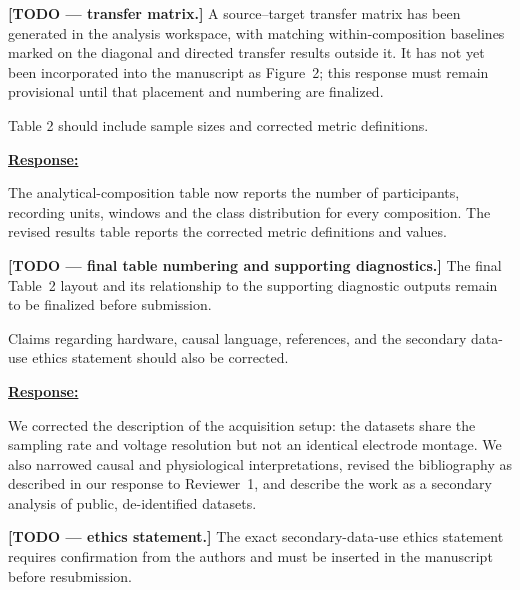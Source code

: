 \documentclass{article}
\begin{document}
\textbf{[TODO --- transfer matrix.]}
A source--target transfer matrix has been generated in the analysis workspace,
with matching within-composition baselines marked on the diagonal and directed
transfer results outside it. It has not yet been incorporated into the
manuscript as Figure~2; this response must remain provisional until that
placement and numbering are finalized.

\vspace{0.3cm}


\begin{cmt}{}{}

Table 2 should include sample sizes and corrected metric definitions.

\end{cmt}
\vspace{0.1cm}
\noindent
\underline{\textbf{Response:}}
\vspace{0.2cm}

The analytical-composition table now reports the number of participants,
recording units, windows and the class distribution for every composition. The
revised results table reports the corrected metric definitions and values.

\textbf{[TODO --- final table numbering and supporting diagnostics.]}
The final Table~2 layout and its relationship to the supporting diagnostic
outputs remain to be finalized before submission.

\vspace{0.3cm}


\begin{cmt}{}{}

Claims regarding hardware, causal language, references, and the secondary
data-use ethics statement should also be corrected.

\end{cmt}
\vspace{0.1cm}
\noindent
\underline{\textbf{Response:}}
\vspace{0.2cm}

We corrected the description of the acquisition setup: the datasets share the
sampling rate and voltage resolution but not an identical electrode montage. We
also narrowed causal and physiological interpretations, revised the bibliography
as described in our response to Reviewer~1, and describe the work as a
secondary analysis of public, de-identified datasets.

\textbf{[TODO --- ethics statement.]}
The exact secondary-data-use ethics statement requires confirmation from the
authors and must be inserted in the manuscript before resubmission.
\end{document}
